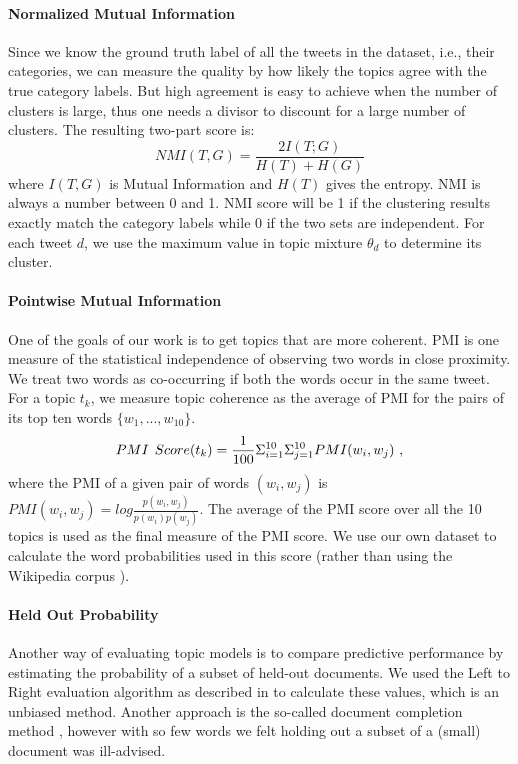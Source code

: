 \documentclass{sig-alternate}
\begin{document}
\paragraph{Normalized Mutual Information}
Since we know the ground truth label of all the tweets in the dataset,
i.e., their categories, we can measure the quality by how likely the
topics agree with the true category labels.
But high agreement is easy to achieve when the number of clusters is
large, thus one needs a divisor to discount for a large number of clusters.
The resulting two-part score is:
\[
NMI(T,G) = \frac{2 I(T;G)}{H(T) + H(G)} 
\]
where $I(T,G)$ is Mutual Information and $H(T)$ gives the entropy. 
NMI \cite{MRS08} is always a number between 0 and 1. NMI score will be
1 if the clustering results exactly match the category labels while 0
if the two sets are independent. For each tweet $d$, we use the
maximum value in topic mixture $ \theta_{d} $ to determine its
cluster. 

\paragraph{Pointwise Mutual Information}
One of the goals of our work is to get topics that are more coherent. 
PMI is one measure of the statistical independence of observing  two words in close proximity. 
We treat two words as co-occurring if both the words occur in the same tweet. 
For a topic $t_k$, we measure topic coherence as the average of
PMI for the pairs of its top ten words $\{w_1,...,w_{10}\}$.
\begin{equation*}
	PMI \hspace{1.5mm} Score(t_k) = \frac{1}{100}\Sigma_{i=1}^{10} \Sigma_{j=1}^{10} PMI(w_i,w_j)~,
\end{equation*}
where the PMI of a given pair of words $(w_i, w_j)$ is
$PMI (w_i,w_j) = log \frac{p(w_i,w_j)}{p(w_i)p(w_j)}$.
The average of the PMI score over all the 10 topics is used as the final measure of the PMI score. 
We use our own dataset to calculate the word probabilities used in this score
(rather than using the Wikipedia corpus \cite{baldwin10}).

\paragraph{Held Out Probability}
Another way of evaluating topic models is to compare predictive performance by estimating the probability of a subset of held-out documents.  We used the Left to Right evaluation algorithm as described in \cite{wallach} to calculate these values, 
which is an unbiased method.  Another approach is the so-called
document completion method \cite{wallach}, however with so few words we felt holding out a subset of a (small) document was ill-advised.
\end{document}
